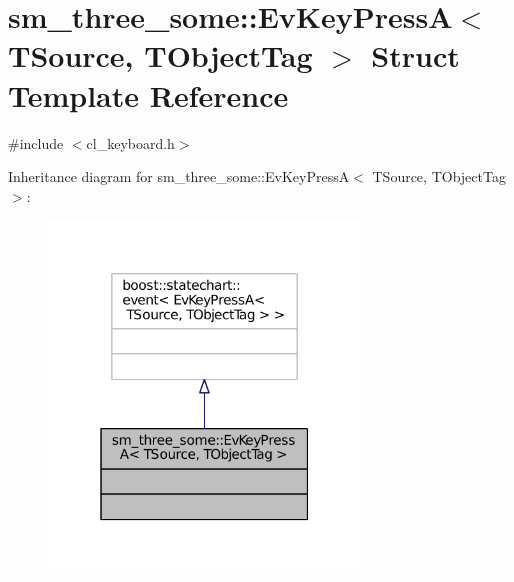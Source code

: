 \hypertarget{structsm__three__some_1_1EvKeyPressA}{}\section{sm\+\_\+three\+\_\+some\+:\+:Ev\+Key\+PressA$<$ T\+Source, T\+Object\+Tag $>$ Struct Template Reference}
\label{structsm__three__some_1_1EvKeyPressA}


{\ttfamily \#include $<$cl\+\_\+keyboard.\+h$>$}



Inheritance diagram for sm\+\_\+three\+\_\+some\+:\+:Ev\+Key\+PressA$<$ T\+Source, T\+Object\+Tag $>$\+:
\nopagebreak
\begin{figure}[H]
\begin{center}
\leavevmode
\includegraphics[width=235pt]{structsm__three__some_1_1EvKeyPressA__inherit__graph}
\end{center}
\end{figure}


